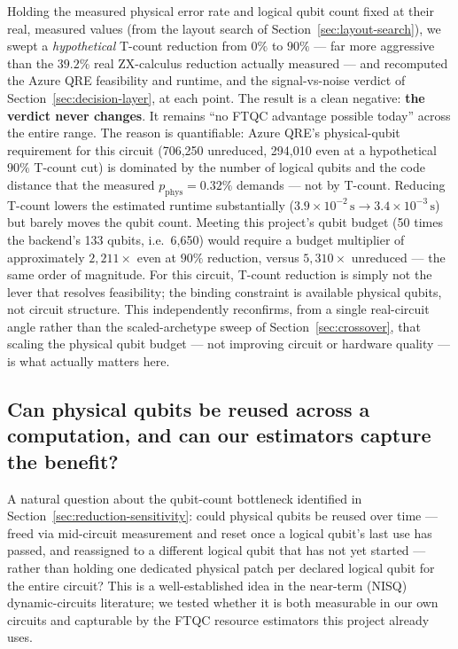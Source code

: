 \documentclass[9pt,twocolumn]{extarticle}
\begin{document}
Holding the measured physical error rate and logical qubit count fixed at
their real, measured values (from the layout search of
Section~\ref{sec:layout-search}), we swept a \emph{hypothetical} T-count
reduction from $0\%$ to $90\%$ --- far more aggressive than the $39.2\%$
real ZX-calculus reduction actually measured --- and recomputed the Azure
QRE feasibility and runtime, and the signal-vs-noise verdict of
Section~\ref{sec:decision-layer}, at each point. The result is a clean
negative: \textbf{the verdict never changes}. It remains ``no FTQC
advantage possible today'' across the entire range. The reason is
quantifiable: Azure QRE's physical-qubit requirement for this circuit
(706{,}250 unreduced, 294{,}010 even at a hypothetical $90\%$ T-count cut)
is dominated by the number of logical qubits and the code distance that
the measured $p_{\mathrm{phys}}=0.32\%$ demands --- not by T-count.
Reducing T-count lowers the estimated runtime substantially ($3.9\times
10^{-2}\,\mathrm{s} \to 3.4\times10^{-3}\,\mathrm{s}$) but barely moves the
qubit count. Meeting this project's qubit budget (50 times the backend's
133 qubits, i.e.\ 6{,}650) would require a budget multiplier of
approximately $2{,}211\times$ even at $90\%$ reduction, versus
$5{,}310\times$ unreduced --- the same order of magnitude. For this
circuit, T-count reduction is simply not the lever that resolves
feasibility; the binding constraint is available physical qubits, not
circuit structure. This independently reconfirms, from a single
real-circuit angle rather than the scaled-archetype sweep of
Section~\ref{sec:crossover}, that scaling the physical qubit budget ---
not improving circuit or hardware quality --- is what actually matters
here.

\subsection{Can physical qubits be reused across a computation, and can our estimators capture the benefit?}
\label{sec:qubit-reuse}
A natural question about the qubit-count bottleneck identified in
Section~\ref{sec:reduction-sensitivity}: could physical qubits be reused
over time --- freed via mid-circuit measurement and reset once a logical
qubit's last use has passed, and reassigned to a different logical qubit
that has not yet started --- rather than holding one dedicated physical
patch per declared logical qubit for the entire circuit? This is a
well-established idea in the near-term (NISQ) dynamic-circuits literature;
we tested whether it is both measurable in our own circuits and capturable
by the FTQC resource estimators this project already uses.
\end{document}
